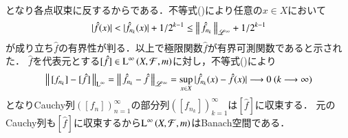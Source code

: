 \begin{prf}
\begin{description}
\begin{align}
			\end{align}
			となり各点収束に反するからである．不等式()により任意の$x \in X$において
			\begin{align}
				|\hat{f}(x)| < |\hat{f}_{n_k}(x)| + 1/2^{k-1} \leq \left\|\, \hat{f}_{n_k}\, \right\|_{\mathscr{L}^\infty} + 1/2^{k-1}
			\end{align}
			が成り立ち$\hat{f}$の有界性が判る．以上で極限関数$\hat{f}$が有界可測関数であると示された．
			$\hat{f}$を代表元とする$[\hat{f}] \in \operatorname{L}^{\infty} \left(X,\mathcal{F},m\right)$に対し，不等式()により
			\begin{align}
				\left\|\, [f_{n_k}] - [\hat{f}]\, \right\|_{\mathrm{L}^\infty} = \left\|\, \hat{f}_{n_k} - \hat{f}\, \right\|_{\mathscr{L}^\infty} 
				= \operatorname*{sup}_{x \in X} |\hat{f}_{n_k}(x) - \hat{f}(x)|
				\longrightarrow 0 \ (k \longrightarrow \infty)
			\end{align}
			となりCauchy列$\left( [f_{n}] \right)_{n=1}^{\infty}$の部分列$\left( [f_{n_k}] \right)_{k=1}^{\infty}$は$[\hat{f}]$に収束する．
			元のCauchy列も$[\hat{f}]$に収束するから$\operatorname{L}^{\infty} \left(X,\mathcal{F},m\right)$はBanach空間である．
			

\end{description}
\end{prf}
